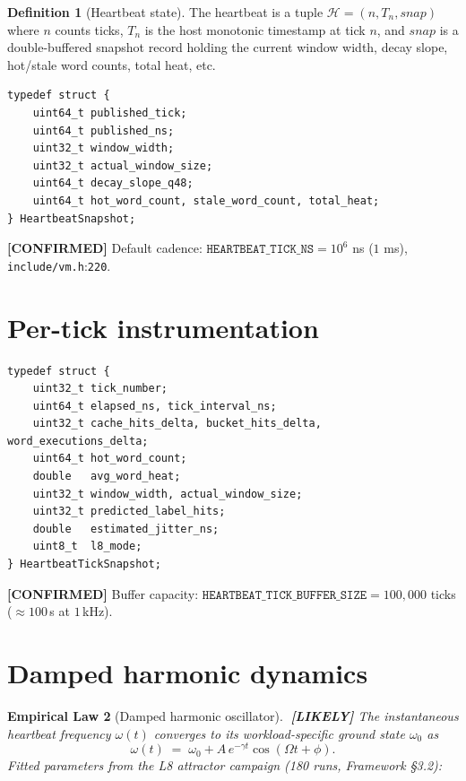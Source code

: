 \documentclass[11pt,letterpaper,openany]{book}
\theoremstyle{definition}
\newtheorem{definition}{Definition}[chapter]
\theoremstyle{plain}
\newtheorem{empiricallaw}[definition]{Empirical Law}
\newcommand{\confirmed}{\textcolor{green!50!black}{\textbf{[CONFIRMED]}}\xspace}
\newcommand{\likely}{\textcolor{blue!60!black}{\textbf{[LIKELY]}}\xspace}
\newcommand{\sourceref}[2]{\texttt{#1}:\texttt{#2}}
\begin{document}
\begin{definition}[Heartbeat state]
The heartbeat is a tuple $\mathcal{H} = (n, T_n, \mathit{snap})$ where $n$
counts ticks, $T_n$ is the host monotonic timestamp at tick $n$, and
$\mathit{snap}$ is a double-buffered snapshot record holding the current
window width, decay slope, hot/stale word counts, total heat, etc.
\end{definition}

\begin{lstlisting}[caption={Heartbeat snapshot
  (\texttt{include/vm.h}:224--234).}]
typedef struct {
    uint64_t published_tick;
    uint64_t published_ns;
    uint32_t window_width;
    uint32_t actual_window_size;
    uint64_t decay_slope_q48;
    uint64_t hot_word_count, stale_word_count, total_heat;
} HeartbeatSnapshot;
\end{lstlisting}

\confirmed Default cadence: $\mathtt{HEARTBEAT\_TICK\_NS} = 10^6$ ns
($1$ ms), \sourceref{include/vm.h}{220}.

\section{Per-tick instrumentation}

\begin{lstlisting}[caption={Per-tick instrumentation snapshot
  (\texttt{include/vm.h}:242--261).}]
typedef struct {
    uint32_t tick_number;
    uint64_t elapsed_ns, tick_interval_ns;
    uint32_t cache_hits_delta, bucket_hits_delta, word_executions_delta;
    uint64_t hot_word_count;
    double   avg_word_heat;
    uint32_t window_width, actual_window_size;
    uint32_t predicted_label_hits;
    double   estimated_jitter_ns;
    uint8_t  l8_mode;
} HeartbeatTickSnapshot;
\end{lstlisting}

\confirmed Buffer capacity: $\mathtt{HEARTBEAT\_TICK\_BUFFER\_SIZE}
= 100{,}000$ ticks ($\approx 100$\,s at $1$\,kHz).

\section{Damped harmonic dynamics}

\begin{empiricallaw}[Damped harmonic oscillator]\label{law:damped}
$\;$\likely
The instantaneous heartbeat frequency $\omega(t)$ converges to its
workload-specific ground state $\omega_0$ as
\begin{equation}\label{eq:damped}
  \omega(t) \;=\; \omega_0 + A\,e^{-\gamma t}\cos(\Omega t + \phi).
\end{equation}
Fitted parameters from the L8 attractor campaign (180 runs, Framework \S3.2):
\end{empiricallaw}
\end{document}
